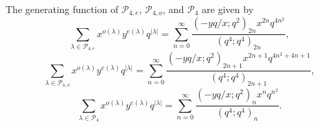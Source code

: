 \documentclass[10pt,a4paper]{amsart}
\begin{document}
\begin{theorem}\label{thm:P4Gen}
The generating function of $\mathcal{P}_{4,e}$, $\mathcal{P}_{4,o}$, and $\mathcal{P}_4$ are given by
\begin{equation}\label{eq:P4eGen}
\sum_{\lambda\in\mathcal{P}_{4,e}}x^{o(\lambda)}y^{e(\lambda)}q^{|\lambda|}=\sum_{n=0}^{\infty}\frac{(-yq/x;q^2)_{2n}x^{2n}q^{4n^2}}{(q^4;q^4)_{2n}},
\end{equation}
\begin{equation}\label{eq:P4oGen}
\sum_{\lambda\in\mathcal{P}_{4,o}}x^{o(\lambda)}y^{e(\lambda)}q^{|\lambda|}=\sum_{n=0}^{\infty}\frac{(-yq/x;q^2)_{2n+1}x^{2n+1}q^{4n^2+4n+1}}{(q^4;q^4)_{2n+1}},
\end{equation}
\begin{equation}\label{eq:P4gen}
\sum_{\lambda\in\mathcal{P}_4}x^{o(\lambda)}y^{e(\lambda)}q^{|\lambda|}=\sum_{n=0}^{\infty}\frac{(-yq/x;q^2)_{n}x^{n}q^{n^2}}{(q^4;q^4)_{n}}.    
\end{equation}
\end{theorem}
\end{document}

